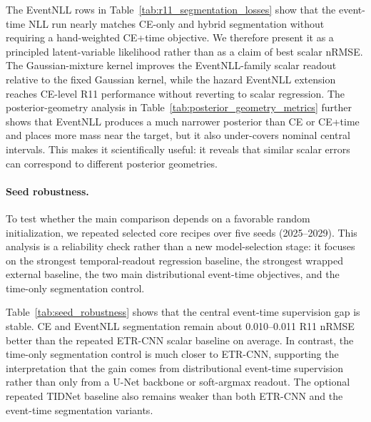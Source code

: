 \documentclass[12pt]{article}
\begin{document}
The EventNLL rows in Table~\ref{tab:r11_segmentation_losses} show that the event-time NLL run nearly matches CE-only and hybrid segmentation without requiring a hand-weighted CE+time objective. We therefore present it as a principled latent-variable likelihood rather than as a claim of best scalar nRMSE. The Gaussian-mixture kernel improves the EventNLL-family scalar readout relative to the fixed Gaussian kernel, while the hazard EventNLL extension reaches CE-level R11 performance without reverting to scalar regression. The posterior-geometry analysis in Table~\ref{tab:posterior_geometry_metrics} further shows that EventNLL produces a much narrower posterior than CE or CE+time and places more mass near the target, but it also under-covers nominal central intervals. This makes it scientifically useful: it reveals that similar scalar errors can correspond to different posterior geometries.

\paragraph{Seed robustness.}
To test whether the main comparison depends on a favorable random initialization, we repeated selected core recipes over five seeds (2025--2029). This analysis is a reliability check rather than a new model-selection stage: it focuses on the strongest temporal-readout regression baseline, the strongest wrapped external baseline, the two main distributional event-time objectives, and the time-only segmentation control.

Table~\ref{tab:seed_robustness} shows that the central event-time supervision gap is stable. CE and EventNLL segmentation remain about 0.010--0.011 R11 nRMSE better than the repeated ETR-CNN scalar baseline on average. In contrast, the time-only segmentation control is much closer to ETR-CNN, supporting the interpretation that the gain comes from distributional event-time supervision rather than only from a U-Net backbone or soft-argmax readout. The optional repeated TIDNet baseline also remains weaker than both ETR-CNN and the event-time segmentation variants.
\end{document}
